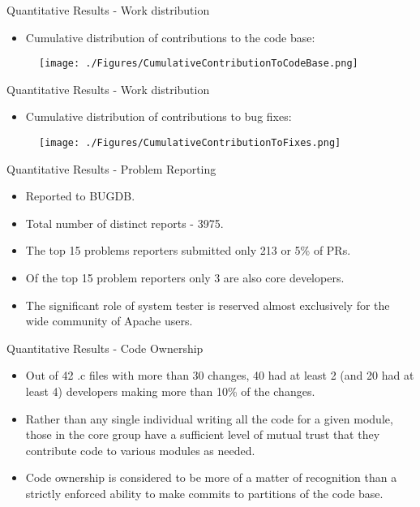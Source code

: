 \documentclass{beamer}
\begin{document}
\begin{frame}{Quantitative Results - Work distribution}
\begin{itemize}
	\item Cumulative distribution of contributions to the code base: 
\end{itemize}
\begin{figure}
	\texttt{[image: ./Figures/CumulativeContributionToCodeBase.png]}
\end{figure}
\end{frame}

\begin{frame}{Quantitative Results - Work distribution}
\begin{itemize}
	\item Cumulative distribution of contributions to bug fixes: 
\end{itemize}
\begin{figure}
	\texttt{[image: ./Figures/CumulativeContributionToFixes.png]}
\end{figure}
\end{frame}

\begin{frame}{Quantitative Results - Problem Reporting}
\begin{itemize}
	\item Reported to BUGDB. \pause
	\item Total number of distinct reports - 3975. \pause
	\item The top 15 problems reporters submitted only 213 or 5\% of PRs. \pause
	\item Of the top 15 problem reporters only 3 are also core developers. \pause
	\item The significant role of system tester is reserved almost exclusively for the wide community of Apache users.
\end{itemize}
\end{frame}

\begin{frame}{Quantitative Results - Code Ownership}
\begin{itemize}
	\item Out of 42 .c files with more than 30 changes, 40 had at least 2 (and 20 had at least 4) developers making more than 10\% of the changes.\pause
	\item Rather than any single individual writing all the code for a given module, those in the core group have a sufficient level of mutual trust that they contribute code to various modules as needed.\pause
	\item Code ownership is considered to be more of a matter of recognition than a strictly enforced ability to make commits to partitions of the code base.
\end{itemize}
\end{frame}
\end{document}
